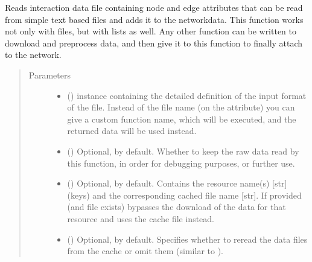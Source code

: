 \documentclass[letterpaper,10pt,english]{sphinxmanual}
\begin{document}
\begin{fulllineitems}

\begin{fulllineitems}
\label{\detokenize{main:pypath.main.PyPath.read_data_file}}
Reads interaction data file containing node and edge attributes
that can be read from simple text based files and adds it to the
networkdata. This function works not only with files, but with
lists as well. Any other function can be written to download and
preprocess data, and then give it to this function to finally
attach to the network.
\begin{quote}\begin{description}
\item[{Parameters}] \leavevmode\begin{itemize}
\item {} 
 () \textendash{}  instance
containing the detailed definition of the input format of
the file. Instead of the file name (on the
attribute) you can give a custom function name, which will
be executed, and the returned data will be used instead.

\item {} 
 () \textendash{} Optional,  by default. Whether to keep the raw data
read by this function, in order for debugging purposes, or
further use.

\item {} 
 () \textendash{} Optional, \sphinxcode{\sphinxupquote{\{\}}} by default. Contains the resource name(s)
{[}str{]} (keys) and the corresponding cached file name {[}str{]}.
If provided (and file exists) bypasses the download of the
data for that resource and uses the cache file instead.

\item {} 
 () \textendash{} Optional,  by default. Specifies whether to reread
the data files from the cache or omit them (similar to
).


\end{itemize}
\end{description}
\end{quote}
\end{fulllineitems}
\end{fulllineitems}
\end{document}
